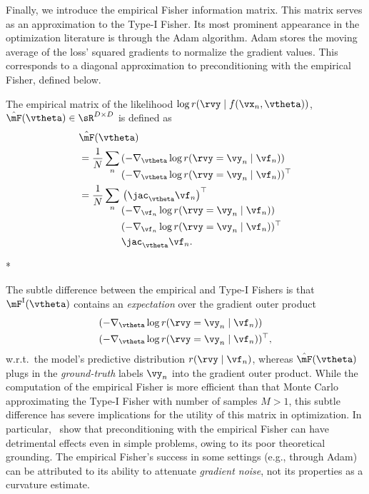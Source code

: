 Finally, we introduce the empirical Fisher information matrix. This matrix serves
as an approximation to the Type-I Fisher. Its most prominent appearance in the
optimization literature is through the Adam algorithm. Adam stores the moving
average of the loss' squared gradients to normalize the gradient values. This
corresponds to a diagonal approximation to preconditioning with the empirical
Fisher, defined below.

\begin{definition}\label{def:emp_fisher}%
  The empirical matrix of the likelihood $\log r(\rvy \mid f(\vx_n, \vtheta))$,
  $\hat{\mF}(\vtheta) \in \sR^{D \times D}$ is defined as
  \begin{align*}
    & \hat{\mF}(\vtheta) \\
	& = \frac{1}{N} \sum_{n}
	\begin{aligned}[t]
	   & (-\nabla_{\vtheta} \log r(\rvy = \vy_n \mid \vf_n))        \\
	   & (-\nabla_{\vtheta} \log r(\rvy = \vy_n \mid \vf_n))^{\top} \\
	\end{aligned} \\
    & = \frac{1}{N} \sum_{n}
    \begin{aligned}[t]
       & \left(\jac_{\vtheta}\vf_n\right)^{\top}                  \\
       & (-\nabla_{\vf_n} \log r(\rvy = \vy_n \mid \vf_n))        \\
       & (-\nabla_{\vf_n} \log r(\rvy = \vy_n \mid \vf_n))^{\top} \\
       & \jac_{\vtheta}\vf_n.
    \end{aligned}
  \end{align*}
\end{definition}

\switchcolumn[1]*
\switchcolumn[0]

The subtle difference between the empirical and Type-I Fishers is that
$\mF^\text{I}(\vtheta)$ contains an \emph{expectation} over the gradient
outer product
\begin{align*}
  &(-\nabla_{\vtheta} \log r(\rvy = \vy_n \mid \vf_n)) \\
  &(-\nabla_{\vtheta} \log r(\rvy = \vy_n \mid \vf_n))^{\top},
\end{align*}
w.r.t.~the model's predictive distribution $r(\rvy \mid \vf_n)$,
whereas $\hat{\mF}(\vtheta)$ plugs in the \emph{ground-truth} labels $\vy_n$
into the gradient outer product. While the computation of the empirical Fisher
is more efficient than that Monte Carlo approximating the Type-I Fisher with
number of samples $M > 1$, this subtle difference
has severe implications for the utility of this matrix in optimization.
In particular,~\citet{kunstner2019limitations} show that preconditioning with
the empirical Fisher can have detrimental effects even in simple problems,
owing to its poor theoretical grounding. The empirical Fisher's success
in some settings (e.g., through Adam) can be attributed to its ability to attenuate
\emph{gradient noise}, not its properties as a curvature estimate.
